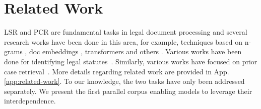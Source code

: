 \section{Related Work} \label{sec:relwork}
LSR and PCR are fundamental tasks in legal document processing and several research works have been done in this area, for example, techniques based on n-grams \cite{salton1988termweight,zeng2007knowledge}, doc embeddings \cite{le2014doc2vec}, transformers \cite{vold2021tflegal} and others \cite{salton1975vector,robertson2009bm25,liu2023ml,hofmann2013balancing,wang2018modeling,ma2022incorporating}. 
Various works have been done for identifying legal statutes~\cite{wang2018modeling,wang2019hmn,chalkidis2019neural,zhong2018topjudge,wu2023precedent,paul2024legal}. 
Similarly, various works have focused on prior case retrieval~\cite{rabelo2022semantic,joshi2023ucreat,tang2024casegnn,tang2024caselink,qin2024ljpretrieval,bhattacharya2020hierspcnet,ma2021retrieving,ma2024llmrelevance}.
More details regarding related work are provided in App. \ref{app:related-work}.
To our knowledge, the two tasks have only been addressed separately. We present the first parallel corpus enabling models to leverage their interdependence.



